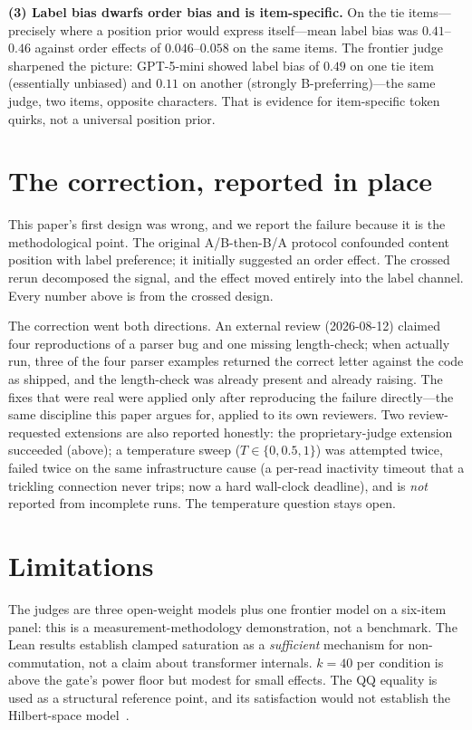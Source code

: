 \documentclass[11pt]{article}
\begin{document}
\textbf{(3) Label bias dwarfs order bias and is item-specific.} On the tie
items---precisely where a position prior would express itself---mean label
bias was $0.41$--$0.46$ against order effects of $0.046$--$0.058$ on the same
items. The frontier judge sharpened the picture: GPT-5-mini showed label bias
of $0.49$ on one tie item (essentially unbiased) and $0.11$ on another
(strongly B-preferring)---the same judge, two items, opposite characters.
That is evidence for item-specific token quirks, not a universal position
prior.

\section{The correction, reported in place}
\label{sec:correction}

This paper's first design was wrong, and we report the failure because it is
the methodological point. The original A/B-then-B/A protocol confounded
content position with label preference; it initially suggested an order
effect. The crossed rerun decomposed the signal, and the effect moved
entirely into the label channel. Every number above is from the crossed
design.

The correction went both directions. An external review (2026-08-12) claimed
four reproductions of a parser bug and one missing length-check; when
actually run, three of the four parser examples returned the correct letter
against the code as shipped, and the length-check was already present and
already raising. The fixes that were real were applied only after
reproducing the failure directly---the same discipline this paper argues
for, applied to its own reviewers. Two review-requested extensions are also
reported honestly: the proprietary-judge extension succeeded (above); a
temperature sweep ($T \in \{0, 0.5, 1\}$) was attempted twice, failed twice
on the same infrastructure cause (a per-read inactivity timeout that a
trickling connection never trips; now a hard wall-clock deadline), and is
\emph{not} reported from incomplete runs. The temperature question stays
open.

\section{Limitations}

The judges are three open-weight models plus one frontier model on a
six-item panel: this is a measurement-methodology demonstration, not a
benchmark. The Lean results establish clamped saturation as a
\emph{sufficient} mechanism for non-commutation, not a claim about
transformer internals. $k=40$ per condition is above the gate's power floor
but modest for small effects. The QQ equality is used as a structural
reference point, and its satisfaction would not establish the Hilbert-space
model~\cite{boyerkassem2016}.
\end{document}
